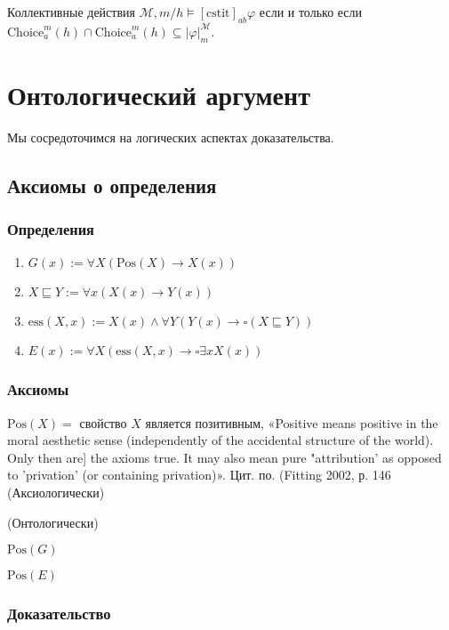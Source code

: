 \documentclass[openany]{book}
\theoremstyle{plain}
\theoremstyle{definition}
\begin{document}
Коллективные действия \(\mathcal{M}, m/h \models [\mathrm{cstit}]_{ab} \varphi\) если и только если \(\mathrm{Choice}_a^m (h) \cap \mathrm{Choice}_a^m (h) \subseteq |\varphi|_m^{\mathcal{M}}\).


\chapter{Онтологический аргумент}

Мы сосредоточимся на логических аспектах доказательства.

\section{Аксиомы о определения}

\subsection{Определения}
\begin{enumerate}
\item \(G(x) := \forall X (\mathrm{Pos}(X) \rightarrow X(x))\)
\item \(X \sqsubseteq Y := \forall x (X(x) \rightarrow Y(x))\)
\item \(\mathrm{ess}(X, x) := X(x) \land \forall Y (Y(x) \rightarrow \square (X \sqsubseteq Y))\)
\item \(E(x) := \forall X (\mathrm{ess}(X, x) \rightarrow \square \exists x X(x))\)
\end{enumerate}

\subsection{Аксиомы}

\(\mathrm{Pos}(X) =\) свойство \(X\) является позитивным,
«Positive means positive in the moral aesthetic sense (independently of the accidental structure of the world). Only then are] the axioms true. It may also mean pure "attribution' as opposed to 'privation' (or containing privation)». Цит. по. (Fitting 2002, р. 146 (Аксиологически)


(Онтологически)

\(\mathrm{Pos}(G)\)

\(\mathrm{Pos}(E)\)

\subsection{Доказательство}
\end{document}
